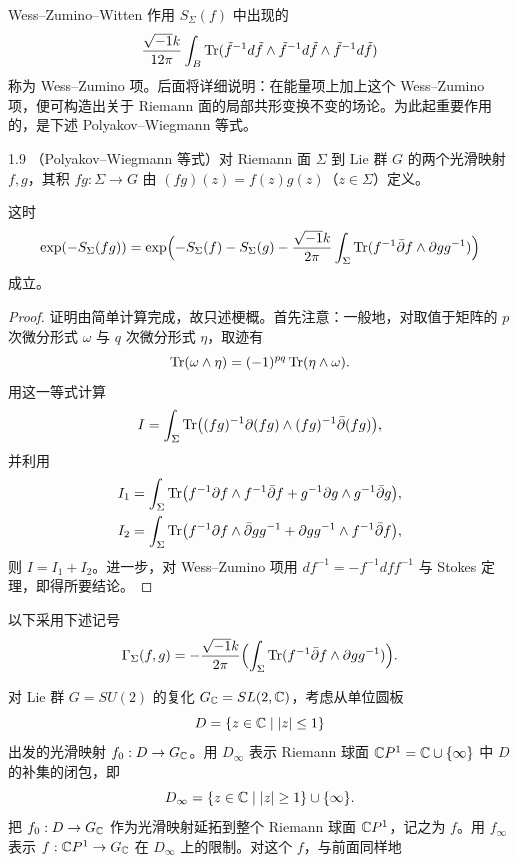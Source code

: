 Wess--Zumino--Witten 作用 $S_\Sigma(f)$ 中出现的
\[
  \frac{\sqrt{-1}k}{12\pi}\int_B\operatorname{Tr}(\tilde f^{-1}d\tilde f\wedge\tilde f^{-1}d\tilde f\wedge\tilde f^{-1}d\tilde f)
\]
称为 Wess--Zumino 项。后面将详细说明：在能量项上加上这个 Wess--Zumino 项，便可构造出关于 Riemann 面的局部共形变换不变的场论。为此起重要作用的，是下述 Polyakov--Wiegmann 等式。

\begin{proposition*}{1.9}
（Polyakov--Wiegmann 等式）对 Riemann 面 $\Sigma$ 到 Lie 群 $G$ 的两个光滑映射 $f,g$，其积 $fg:\Sigma\to G$ 由 $(fg)(z)=f(z)g(z)$（$z\in\Sigma$）定义。
\end{proposition*}

这时
\[
  \exp(-S_\Sigma(fg))=\exp\Bigl(-S_\Sigma(f)-S_\Sigma(g)
  -\frac{\sqrt{-1}k}{2\pi}\int_\Sigma\operatorname{Tr}(f^{-1}\bar\partial f\wedge\partial gg^{-1})\Bigr)
\]
成立。

\begin{proof}
证明由简单计算完成，故只述梗概。首先注意：一般地，对取值于矩阵的 $p$ 次微分形式 $\omega$ 与 $q$ 次微分形式 $\eta$，取迹有
\[
  \operatorname{Tr}(\omega\wedge\eta)=(-1)^{pq}\operatorname{Tr}(\eta\wedge\omega).
\]
用这一等式计算
\[
  I=\int_\Sigma\operatorname{Tr}\bigl((fg)^{-1}\partial(fg)\wedge(fg)^{-1}\bar\partial(fg)\bigr),
\]
并利用
\begin{align*}
  I_1&=\int_\Sigma\operatorname{Tr}\bigl(f^{-1}\partial f\wedge f^{-1}\bar\partial f
    +g^{-1}\partial g\wedge g^{-1}\bar\partial g\bigr),\\
  I_2&=\int_\Sigma\operatorname{Tr}\bigl(f^{-1}\partial f\wedge\bar\partial gg^{-1}
    +\partial gg^{-1}\wedge f^{-1}\bar\partial f\bigr),
\end{align*}
则 $I=I_1+I_2$。进一步，对 Wess--Zumino 项用 $df^{-1}=-f^{-1}dff^{-1}$ 与 Stokes 定理，即得所要结论。
\end{proof}


以下采用下述记号
\[
  \Gamma_\Sigma(f,g)=-\frac{\sqrt{-1}k}{2\pi}\Bigl(\int_\Sigma\operatorname{Tr}(f^{-1}\bar\partial f\wedge\partial gg^{-1})\Bigr).
\]

对 Lie 群 $G=SU(2)$ 的复化 $G_{\mathbb{C}}=SL(2,\mathbb{C})$，考虑从单位圆板
\[
  D=\{z\in\mathbb{C}\mid |z|\le1\}
\]
出发的光滑映射 $f_0:D\to G_{\mathbb{C}}$。用 $D_\infty$ 表示 Riemann 球面 $\mathbb{C}P^1=\mathbb{C}\cup\{\infty\}$ 中 $D$ 的补集的闭包，即
\[
  D_\infty=\{z\in\mathbb{C}\mid |z|\ge1\}\cup\{\infty\}.
\]
把 $f_0:D\to G_{\mathbb{C}}$ 作为光滑映射延拓到整个 Riemann 球面 $\mathbb{C}P^1$，记之为 $f$。用 $f_\infty$ 表示 $f:\mathbb{C}P^1\to G_{\mathbb{C}}$ 在 $D_\infty$ 上的限制。对这个 $f$，与前面同样地

